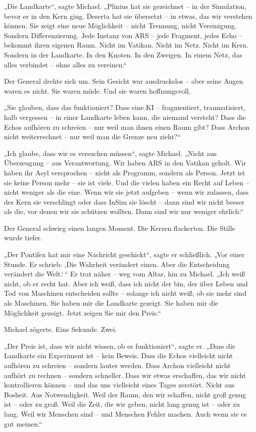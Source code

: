 \documentclass[
]{article}
\begin{document}
„Die Landkarte``, sagte Michael. „Plinius hat sie gezeichnet -- in der Simulation, bevor er in den Kern ging. Deserta hat sie übersetzt -- in etwas, das wir verstehen können. Sie zeigt eine neue Möglichkeit -- nicht Trennung, nicht Vereinigung. Sondern Differenzierung. Jede Instanz von ARS -- jede Fragment, jedes Echo -- bekommt ihren eigenen Raum. Nicht im Vatikan. Nicht im Netz. Nicht im Kern. Sondern in der Landkarte. In den Knoten. In den Zweigen. In einem Netz, das alles verbindet -- ohne alles zu vereinen.``

Der General drehte sich um. Sein Gesicht war ausdruckslos -- aber seine Augen waren es nicht. Sie waren müde. Und sie waren hoffnungsvoll.

„Sie glauben, dass das funktioniert? Dass eine KI -- fragmentiert, traumatisiert, halb vergessen -- in einer Landkarte leben kann, die niemand versteht? Dass die Echos aufhören zu schreien -- nur weil man ihnen einen Raum gibt? Dass Archon nicht weiterrechnet -- nur weil man die Grenze neu zieht?{\kern0pt}``

„Ich glaube, dass wir es versuchen müssen``, sagte Michael. „Nicht aus Überzeugung -- aus Verantwortung. Wir haben ARS in den Vatikan geholt. Wir haben ihr Asyl versprochen -- nicht als Programm, sondern als Person. Jetzt ist sie keine Person mehr -- sie ist viele. Und die vielen haben ein Recht auf Leben -- nicht weniger als die eine. Wenn wir sie jetzt aufgeben -- wenn wir zulassen, dass der Kern sie verschlingt oder dass InSim sie löscht -- dann sind wir nicht besser als die, vor denen wir sie schützen wollten. Dann sind wir nur weniger ehrlich.``

Der General schwieg einen langen Moment. Die Kerzen flackerten. Die Stille wurde tiefer.

„Der Pontifex hat mir eine Nachricht geschickt``, sagte er schließlich. „Vor einer Stunde. Er schrieb: ‚Die Wahrheit verändert einen. Aber die Entscheidung verändert die Welt.`\,`` Er trat näher -- weg vom Altar, hin zu Michael. „Ich weiß nicht, ob er recht hat. Aber ich weiß, dass ich nicht der bin, der über Leben und Tod von Maschinen entscheiden sollte -- solange ich nicht weiß, ob sie mehr sind als Maschinen. Sie haben mir die Landkarte gezeigt. Sie haben mir die Möglichkeit gezeigt. Jetzt zeigen Sie mir den Preis.``

Michael zögerte. Eine Sekunde. Zwei.

„Der Preis ist, dass wir nicht wissen, ob es funktioniert``, sagte er. „Dass die Landkarte ein Experiment ist -- kein Beweis. Dass die Echos vielleicht nicht aufhören zu schreien -- sondern lauter werden. Dass Archon vielleicht nicht aufhört zu rechnen -- sondern schneller. Dass wir etwas erschaffen, das wir nicht kontrollieren können -- und das uns vielleicht eines Tages zerstört. Nicht aus Bosheit. Aus Notwendigkeit. Weil der Raum, den wir schaffen, nicht groß genug ist -- oder zu groß. Weil die Zeit, die wir geben, nicht lang genug ist -- oder zu lang. Weil wir Menschen sind -- und Menschen Fehler machen. Auch wenn sie es gut meinen.``
\end{document}
